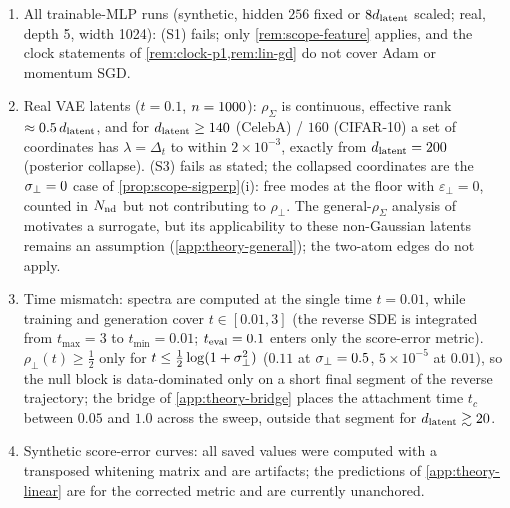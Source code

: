 \begin{remark}
\begin{enumerate}
\item All trainable-MLP runs (synthetic, hidden $256$ fixed or $8d_{\mathrm{latent}}$ scaled; real, depth 5, width 1024): (S1) fails; only \cref{rem:scope-feature} applies, and the clock statements of \cref{rem:clock-p1,rem:lin-gd} do not cover Adam or momentum SGD.
\item Real VAE latents ($t=0.1$, $n=1000$): $\rho_\Sigma$ is continuous, effective rank $\approx0.5\,d_{\mathrm{latent}}$, and for $d_{\mathrm{latent}}\ge140$ (CelebA) / $160$ (CIFAR-10) a set of coordinates has $\lambda=\Delta_t$ to within $2\times10^{-3}$, exactly from $d_{\mathrm{latent}}=200$ (posterior collapse). (S3) fails as stated; the collapsed coordinates are the $\sigma_{\perp}=0$ case of \cref{prop:scope-sigperp}(i): free modes at the floor with $\varepsilon_\perp=0$, counted in $N_{\rm nd}$ but not contributing to $\rho_\perp$. The general-$\rho_\Sigma$ analysis of \citet[Thm.~3.1]{bonnaire2025} motivates a surrogate, but its applicability to these non-Gaussian latents remains an assumption (\cref{app:theory-general}); the two-atom edges do not apply.
\item Time mismatch: spectra are computed at the single time $t=0.01$, while training and generation cover $t\in[0.01,3]$ (the reverse SDE is integrated from $t_{\max}=3$ to $t_{\min}=0.01$; $t_{\rm eval}=0.1$ enters only the score-error metric). $\rho_\perp(t)\ge\tfrac12$ only for $t\le\tfrac12\log(1+\sigma_{\perp}^2)$ ($0.11$ at $\sigma_{\perp}=0.5$, $5\times10^{-5}$ at $0.01$), so the null block is data-dominated only on a short final segment of the reverse trajectory; the bridge of \cref{app:theory-bridge} places the attachment time $t_c$ between $0.05$ and $1.0$ across the sweep, outside that segment for $d_{\mathrm{latent}}\gtrsim20$.
\item Synthetic score-error curves: all saved values were computed with a transposed whitening matrix and are artifacts; the predictions of \cref{app:theory-linear} are for the corrected metric and are currently unanchored.
\end{enumerate}
\end{remark}
